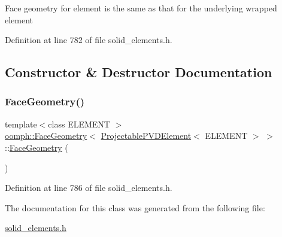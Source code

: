 Face geometry for element is the same as that for the underlying wrapped element 

Definition at line 782 of file solid\+\_\+elements.\+h.



\subsection{Constructor \& Destructor Documentation}
\mbox{\label{classoomph_1_1FaceGeometry_3_01ProjectablePVDElement_3_01ELEMENT_01_4_01_4_ac1546b75e995384c2f2552fcb282b348}} 
\subsubsection{\texorpdfstring{Face\+Geometry()}{FaceGeometry()}}
{\footnotesize\ttfamily template$<$class E\+L\+E\+M\+E\+NT $>$ \\
\hyperlink{classoomph_1_1FaceGeometry}{oomph\+::\+Face\+Geometry}$<$ \hyperlink{classoomph_1_1ProjectablePVDElement}{Projectable\+P\+V\+D\+Element}$<$ E\+L\+E\+M\+E\+NT $>$ $>$\+::\hyperlink{classoomph_1_1FaceGeometry}{Face\+Geometry} (\begin{DoxyParamCaption}{ }\end{DoxyParamCaption})\hspace{0.3cm}{\ttfamily [inline]}}



Definition at line 786 of file solid\+\_\+elements.\+h.



The documentation for this class was generated from the following file\+:\begin{DoxyCompactItemize}
\item 
\hyperlink{solid__elements_8h}{solid\+\_\+elements.\+h}\end{DoxyCompactItemize}
